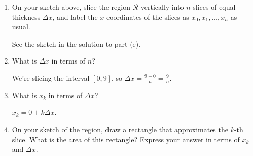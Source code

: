 \documentclass{article}
\begin{document}
\begin{enumerate}
\begin{enumerate}
\begin{solution}
\begin{center}
\begin{tikzpicture}
    \end{tikzpicture}
    \end{center}
           
    \end{solution}
\item  On your sketch above, slice the region $\mathcal{R}$ vertically into $n$ slices of equal thickness $\Delta x$, and label the $x$-coordinates of the slices as $x_0, x_1, \ldots, x_n$ as usual. 



      \begin{solution}
          See the sketch in the solution to part (e). 
      \end{solution}
      
\item What is $\Delta x$ in terms of $n$? 

\begin{solution}
    We're slicing the interval $[0, 9]$, so $\Delta x = \frac{9 - 0}{n}
      = \frac{9}{n}$.
\end{solution}

\pspace{\vfill}
\item What is $x_k$ in terms
      of $\Delta x$? 
   

    \begin{solution}
      $x_k = 0 + k \Delta x$.
    \end{solution}
\pspace{\vfill}
  \item On your sketch of the region, draw a rectangle that approximates the
      $k$-th slice.  What is the area of this rectangle? Express your answer in terms of $x_k$ and $\Delta x$.
    

    \begin{solution}
    

\end{solution}
\end{enumerate}
\end{enumerate}
\end{document}
